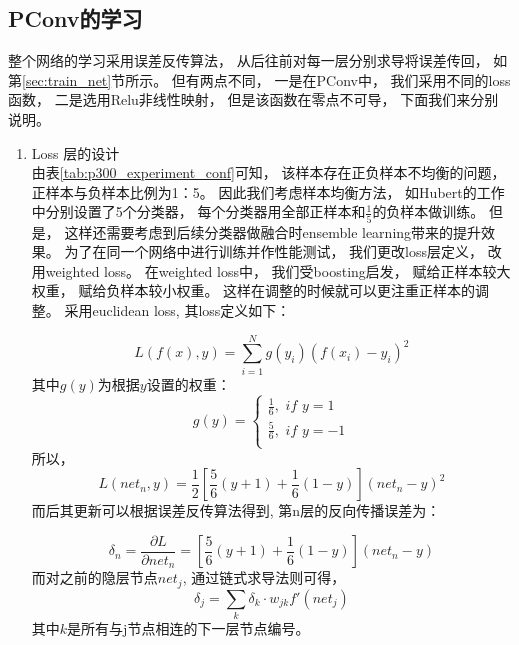 \subsection{PConv的学习}\label{sec:weighted_loss}
整个网络的学习采用误差反传算法， 从后往前对每一层分别求导将误差传回， 如第\ref{sec:train_net}节所示。 但有两点不同， 一是在PConv中， 我们采用不同的loss函数， 二是选用Relu非线性映射， 但是该函数在零点不可导， 下面我们来分别说明。 
\begin{enumerate}
	\item Loss 层的设计\\
		由表\ref{tab:p300_experiment_conf}可知， 该样本存在正负样本不均衡的问题， 正样本与负样本比例为1：5。 因此我们考虑样本均衡方法， 如Hubert的工作中分别设置了5个分类器， 每个分类器用全部正样本和$\frac{1}{5}$的负样本做训练。 但是， 这样还需要考虑到后续分类器做融合时ensemble learning带来的提升效果。 为了在同一个网络中进行训练并作性能测试， 我们更改loss层定义， 改用weighted loss。 
		在weighted loss中， 我们受boosting启发\cite{freund1997decision}， 赋给正样本较大权重， 赋给负样本较小权重。 这样在调整的时候就可以更注重正样本的调整。 采用euclidean loss, 其loss定义如下：

\begin{equation}
	L(f(x),y) = \sum_{i=1}^N {g(y_i)(f(x_i) - y_i)^2}
\end{equation}
其中$g(y)$为根据$y$设置的权重：
\begin{equation*}
  g(y)=\left\{
    \begin{array}{lr}
        \frac{1}{6}, \,\, if\,\, y=1\\
        \frac{5}{6}, \,\, if\,\, y=-1\\
    \end{array}
  \right.
\end{equation*}
所以， 
\begin{equation}
	L(net_n,y) = \frac{1}{2}[\frac{5}{6}(y+1) + \frac{1}{6}(1-y)](net_n-y)^2
\end{equation}
	而后其更新可以根据误差反传算法得到, 第n层的反向传播误差为：
	
\begin{equation}
	\delta_n = \frac{\partial L}{\partial net_n} = [\frac{5}{6}(y+1) + \frac{1}{6}(1-y)](net_n-y)
\end{equation}
	而对之前的隐层节点$net_j$, 通过链式求导法则可得，
\begin{equation}
	\delta_j = \sum_k{\delta_k\cdot w_{jk}f'(net_j)}
\end{equation}	
	其中$k$是所有与j节点相连的下一层节点编号。
	

\end{enumerate}
